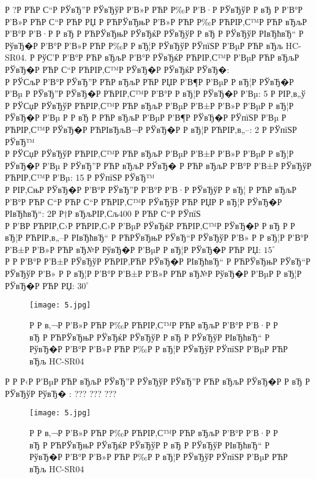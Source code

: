 \documentclass[a4paper,14pt]{extarticle}
\begin{document}
	Р  ?Р РЋР С“Р  РЎвЂ”Р  РЎвЂўР  Р’В»Р РЋР Р‰Р  Р’В·Р  РЎвЂўР  Р вЂ Р  Р’В°Р  Р’В»Р РЋР С“Р РЋР РЏ Р РЋРЎвЂњР  Р’В»Р РЋР Р‰Р РЋРІР‚С™Р РЋР вЂљР  Р’В°Р  Р’В·Р  Р вЂ Р РЋРЎвЂњР  РЎвЂќР  РЎвЂўР  Р вЂ Р  РЎвЂўР  РІвЂћвЂ“ Р  РўвЂ�Р  Р’В°Р  Р’В»Р РЋР Р‰Р  Р вЂ¦Р  РЎвЂўР  РЎпїЅР  Р’ВµР РЋР вЂљ HC-SR04. 
	Р  РўС’Р  Р’В°Р РЋР вЂљР  Р’В°Р  РЎвЂќР РЋРІР‚С™Р  Р’ВµР РЋР вЂљР  РЎвЂ�Р РЋР С“Р РЋРІР‚С™Р  РЎвЂ�Р  РЎвЂќР  РЎвЂ�:\\
   Р  РЎСљР  Р’В°Р  РЎвЂ”Р РЋР вЂљР РЋР РЏР  Р’В¶Р  Р’ВµР  Р вЂ¦Р  РЎвЂ�Р  Р’Вµ Р  РЎвЂ”Р  РЎвЂ�Р РЋРІР‚С™Р  Р’В°Р  Р вЂ¦Р  РЎвЂ�Р  Р’Вµ: 5 Р  РІР‚в„ў\\
   Р  РЎСџР  РЎвЂўР РЋРІР‚С™Р РЋР вЂљР  Р’ВµР  Р’В±Р  Р’В»Р  Р’ВµР  Р вЂ¦Р  РЎвЂ�Р  Р’Вµ Р  Р вЂ  Р РЋР вЂљР  Р’ВµР  Р’В¶Р  РЎвЂ�Р  РЎпїЅР  Р’Вµ Р РЋРІР‚С™Р  РЎвЂ�Р РЋРІвЂљВ¬Р  РЎвЂ�Р  Р вЂ¦Р РЋРІР‚в„–: 2 Р  РЎпїЅР  РЎвЂ™\\
   Р  РЎСџР  РЎвЂўР РЋРІР‚С™Р РЋР вЂљР  Р’ВµР  Р’В±Р  Р’В»Р  Р’ВµР  Р вЂ¦Р  РЎвЂ�Р  Р’Вµ Р  РЎвЂ”Р РЋР вЂљР  РЎвЂ� Р РЋР вЂљР  Р’В°Р  Р’В±Р  РЎвЂўР РЋРІР‚С™Р  Р’Вµ: 15 Р  РЎпїЅР  РЎвЂ™\\
   Р  РІР‚СњР  РЎвЂ�Р  Р’В°Р  РЎвЂ”Р  Р’В°Р  Р’В·Р  РЎвЂўР  Р вЂ¦ Р РЋР вЂљР  Р’В°Р РЋР С“Р РЋР С“Р РЋРІР‚С™Р  РЎвЂўР РЋР РЏР  Р вЂ¦Р  РЎвЂ�Р  РІвЂћвЂ“: 2Р Р†Р вЂљРІР‚Сљ400 Р РЋР С“Р  РЎпїЅ\\
   Р  Р’В­Р РЋРІР‚С›Р РЋРІР‚С›Р  Р’ВµР  РЎвЂќР РЋРІР‚С™Р  РЎвЂ�Р  Р вЂ Р  Р вЂ¦Р РЋРІР‚в„–Р  РІвЂћвЂ“ Р РЋРЎвЂњР  РЎвЂ“Р  РЎвЂўР  Р’В» Р  Р вЂ¦Р  Р’В°Р  Р’В±Р  Р’В»Р РЋР вЂ№Р  РўвЂ�Р  Р’ВµР  Р вЂ¦Р  РЎвЂ�Р РЋР РЏ: $15^\circ$\\
   Р   Р  Р’В°Р  Р’В±Р  РЎвЂўР РЋРІР‚РЋР  РЎвЂ�Р  РІвЂћвЂ“ Р РЋРЎвЂњР  РЎвЂ“Р  РЎвЂўР  Р’В» Р  Р вЂ¦Р  Р’В°Р  Р’В±Р  Р’В»Р РЋР вЂ№Р  РўвЂ�Р  Р’ВµР  Р вЂ¦Р  РЎвЂ�Р РЋР РЏ: $30^\circ$\\


\begin{figure}[h!]
\centering
\texttt{[image: 5.jpg]}
\caption{Р  Р в‚¬Р  Р’В»Р РЋР Р‰Р РЋРІР‚С™Р РЋР вЂљР  Р’В°Р  Р’В·Р  Р вЂ Р РЋРЎвЂњР  РЎвЂќР  РЎвЂўР  Р вЂ Р  РЎвЂўР  РІвЂћвЂ“ Р  РўвЂ�Р  Р’В°Р  Р’В»Р РЋР Р‰Р  Р вЂ¦Р  РЎвЂўР  РЎпїЅР  Р’ВµР РЋР вЂљ HC-SR04}
\label{graph_fragment}
\end{figure} 
  
	Р  Р Р‹Р  Р’ВµР РЋР вЂљР  РЎвЂ”Р  РЎвЂўР  РЎвЂ”Р РЋР вЂљР  РЎвЂ�Р  Р вЂ Р  РЎвЂўР  РўвЂ� :
	???
	???
	???

\begin{figure}[h!]
\centering
\texttt{[image: 5.jpg]}
\caption{Р  Р в‚¬Р  Р’В»Р РЋР Р‰Р РЋРІР‚С™Р РЋР вЂљР  Р’В°Р  Р’В·Р  Р вЂ Р РЋРЎвЂњР  РЎвЂќР  РЎвЂўР  Р вЂ Р  РЎвЂўР  РІвЂћвЂ“ Р  РўвЂ�Р  Р’В°Р  Р’В»Р РЋР Р‰Р  Р вЂ¦Р  РЎвЂўР  РЎпїЅР  Р’ВµР РЋР вЂљ HC-SR04}
\label{graph_fragment}
\end{figure} 
\end{document}
